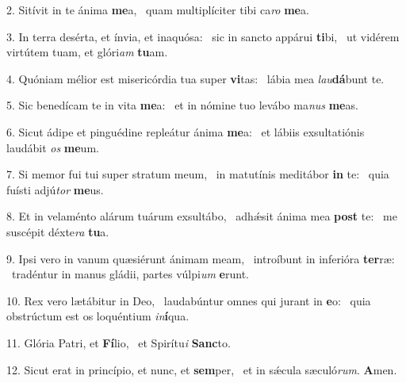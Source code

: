 2. Sitívit in te ánima \textbf{me}a, \ast\  quam multiplíciter tibi ca\textit{ro} \textbf{me}a.\

3. In terra desérta, et ínvia, et inaquósa: \dag\  sic in sancto appárui \textbf{ti}bi, \ast\  ut vidérem virtútem tuam, et glóri\textit{am} \textbf{tu}am.\

4. Quóniam mélior est misericórdia tua super \textbf{vi}tas: \ast\  lábia mea \textit{lau}\textbf{dá}bunt te.\

5. Sic benedícam te in vita \textbf{me}a: \ast\  et in nómine tuo levábo ma\textit{nus} \textbf{me}as.\

6. Sicut ádipe et pinguédine repleátur ánima \textbf{me}a: \ast\  et lábiis exsultatiónis laudábit \textit{os} \textbf{me}um.\

7. Si memor fui tui super stratum meum, \dag\  in matutínis meditábor \textbf{in} te: \ast\  quia fuísti adjú\textit{tor} \textbf{me}us.\

8. Et in velaménto alárum tuárum exsultábo, \dag\  adhǽsit ánima mea \textbf{post} te: \ast\  me suscépit déxte\textit{ra} \textbf{tu}a.\

9. Ipsi vero in vanum quæsiérunt ánimam meam, \dag\  introíbunt in inferióra \textbf{ter}ræ: \ast\  tradéntur in manus gládii, partes vúlpi\textit{um} \textbf{e}runt.\

10. Rex vero lætábitur in Deo, \dag\  laudabúntur omnes qui jurant in \textbf{e}o: \ast\  quia obstrúctum est os loquéntium \textit{in}\textbf{í}qua.\

11. Glória Patri, et \textbf{Fí}lio, \ast\  et Spirítu\textit{i} \textbf{Sanc}to.\

12. Sicut erat in princípio, et nunc, et \textbf{sem}per, \ast\  et in sǽcula sæculó\textit{rum}. \textbf{A}men.\

